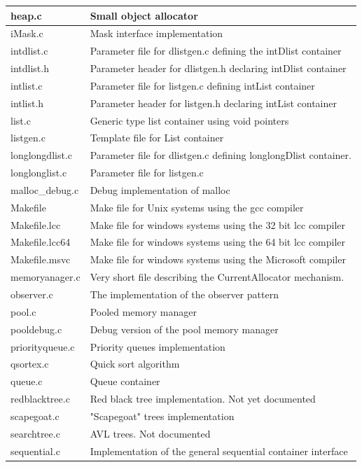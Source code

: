 \documentclass[12pt,a4paper]{memoir} %
\begin{document}
{{{\begin{longtable}{||p{3.5cm}|p{11cm}||}
heap.c&Small object allocator\\\hline
iMask.c&Mask interface implementation\\\hline
intdlist.c&Parameter file for dlistgen.c defining the intDlist container\\\hline
intdlist.h&Parameter header for dlistgen.h declaring intDlist container\\\hline
intlist.c&Parameter file for listgen.c defining intList container\\\hline
intlist.h&Parameter header for listgen.h declaring intList container\\\hline
list.c&Generic type list container using void pointers\\\hline
listgen.c&Template file for List container\\\hline
longlongdlist.c&Parameter file for dlistgen.c defining longlongDlist container.\\\hline
longlonglist.c&Parameter file for listgen.c\\\hline
malloc\_debug.c&Debug implementation of malloc\\\hline
Makefile&Make file for Unix systems using the gcc compiler\\\hline
Makefile.lcc&Make file for windows systems using the 32 bit lcc compiler\\\hline
Makefile.lcc64&Make file for windows systems using the 64 bit lcc compiler\\\hline
Makefile.msvc&Make file for windows systems using the Microsoft compiler\\\hline
memoryanager.c&Very short file describing the CurrentAllocator mechanism.\\\hline
observer.c&The implementation of the observer pattern\\\hline
pool.c&Pooled memory manager\\\hline
pooldebug.c&Debug version of the pool memory manager\\\hline
priorityqueue.c&Priority queues implementation\\\hline
qsortex.c&Quick sort algorithm\\\hline
queue.c&Queue container\\\hline
redblacktree.c&Red black tree implementation. Not yet documented\\\hline
scapegoat.c&"Scapegoat" trees implementation\\\hline
searchtree.c&AVL trees. Not documented\\\hline
sequential.c&Implementation of the general sequential container interface\\\hline

\end{longtable}}}}
\end{document}
